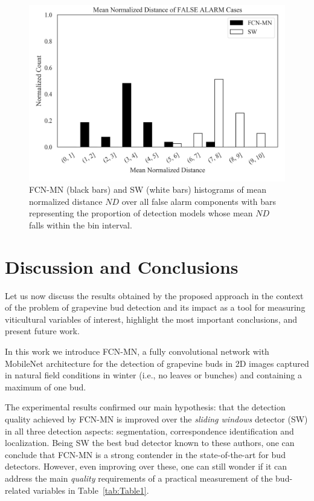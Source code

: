 \documentclass[a4paper,authoryear,review]{elsarticle}
\begin{document}
\begin{figure}%
    \centering
  \includegraphics[width=\textwidth]{figures/Figure7.png}%
\caption{
FCN-MN (black bars) and SW (white bars) histograms of mean normalized distance $ND$ over all false alarm components with bars representing the proportion of detection models whose mean $ND$ falls within the bin interval.
    }
\label{fig:Figure7}
\end{figure}


\section{Discussion and Conclusions}
\label{sec:discussion}

Let us now discuss the results obtained by the proposed approach in the context of the problem of grapevine bud detection and its impact as a tool for measuring viticultural variables of interest, highlight the most important conclusions, and present future work. 

In this work we introduce FCN-MN, a fully convolutional network with MobileNet architecture for the detection of grapevine buds in 2D images captured in natural field conditions in winter (i.e., no leaves or bunches) and containing a maximum of one bud.

The experimental results confirmed our main hypothesis: that the detection quality achieved by FCN-MN is improved over the \emph{sliding windows} detector (SW) in all three detection aspects: segmentation, correspondence identification and localization. Being SW the best bud detector known to these authors, one can conclude that FCN-MN is a strong contender in the state-of-the-art for bud detectors. However, even improving over these, one can still wonder if it can address the main \emph{quality} requirements of a practical measurement of the bud-related variables in Table~\ref{tab:Table1}.
\end{document}
